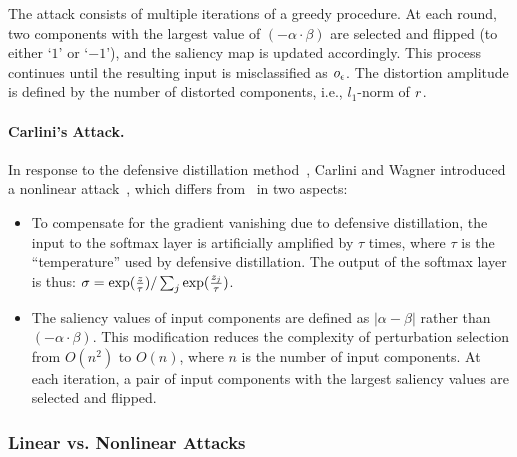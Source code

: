The attack consists of multiple iterations of a greedy procedure.
At each round, two components with the largest value of $(-\alpha \cdot \beta)$ are selected and flipped (to either `$1$' or `$-1$'), and the saliency map is updated accordingly. This process continues until the resulting input is misclassified as $o_\epsilon$. The distortion amplitude is defined by the number of distorted components, i.e., $l_1$-norm of $r$.



\paragraph*{Carlini's Attack.\;} In response to the defensive distillation method~\cite{Papernot:2016:sp}, Carlini and Wagner introduced a nonlinear attack~\cite{Carlini:2016:arXiv}, which differs from~\cite{Papernot:2016:eurosp} in two  aspects:

\begin{itemize}
\item To compensate for the gradient vanishing due to defensive distillation, the input to the softmax layer is artificially amplified by $\tau$ times, where $\tau$ is the ``temperature'' used by defensive distillation. The output of the softmax layer is thus:
$\sigma = \exp(\frac{z}{\tau})/\sum_j \exp(\frac{z_j}{\tau})$.

\item The saliency values of input components are defined as $|\alpha - \beta|$ rather than $(-\alpha \cdot  \beta)$. This modification reduces the complexity of perturbation selection from $O(n^2)$ to $O(n)$, where $n$ is the number of input components. At each iteration, a pair of input components with the largest saliency values are selected and flipped.
\end{itemize}



\subsubsection{Linear vs. Nonlinear Attacks}

